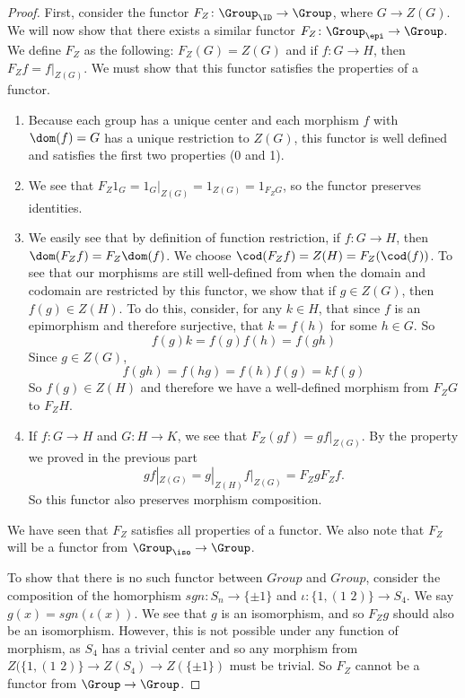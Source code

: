 \documentclass[main.tex]{subfiles}
\begin{document}
\begin{proof}


First, consider the functor $F_Z\colon \Group_{\ID}\rightarrow \Group$, where $G \rightarrow Z(G)$. We will now show that there exists a similar functor $F_Z\colon \Group_{\epi} \rightarrow \Group$. We define $F_Z$ as the following: $F_Z(G) = Z(G)$ and if $f\colon G \rightarrow H$, then $F_{Z} f = f|_{Z(G)}$. We must show that this functor satisfies the properties of a functor.
\begin{enumerate}
    \item Because each group has a unique center and each morphism $f$ with $\dom(f) = G$ has a unique restriction to $Z(G)$, this functor is well defined and satisfies the first two properties (0 and 1).
    \item We see that $F_{Z} 1_{G} = 1_{G}|_{Z(G)} = 1_{Z(G)} = 1_{F_{Z}G}$, so the functor preserves identities. 
    \item We easily see that by definition of function restriction, if $f\colon G \rightarrow H$, then $\dom(F_{Z}f) = F_{Z}\dom(f)$. We choose $\cod(F_{Z}f) = Z(H) = F_Z(\cod(f))$.  To see that our morphisms are still well-defined from when the domain and codomain are restricted by this functor, we show that if $g \in Z(G)$, then $f(g) \in Z(H)$. To do this, consider, for any $k \in H$, that since $f$ is an epimorphism and therefore surjective, that $k = f(h)$ for some $h \in G$. So \[f(g)k = f(g)f(h) = f(gh)\]Since $g \in Z(G)$, \[f(gh) = f(hg) = f(h)f(g) = kf(g)\] So $f(g) \in Z(H)$ and therefore we have a well-defined morphism from $F_ZG$ to $F_ZH$. 
    \item If $f\colon G \rightarrow H$ and $G\colon H \rightarrow K$, we see that $F_Z(gf) = gf|_{Z(G)}$. By the property we proved in the previous part \[gf|_{Z(G)} = g|_{Z(H)}f|_{Z(G)} = F_ZgF_Zf.\] So this functor also preserves morphism composition. 
\end{enumerate}

We have seen that $F_Z$ satisfies all properties of a functor. We also note that $F_Z$ will be a functor from $\Group_{\iso} \rightarrow \Group$. 

To show that there is no such functor between $Group$ and $Group$, consider the composition of the homorphism $sgn\colon S_n \rightarrow \{ \pm 1 \} $ and $\iota\colon \{1, (1 \,\, 2) \} \rightarrow S_4$. We say $ g(x) = sgn(\iota(x))$. We see that $g$ is an isomorphism, and so $F_Zg$ should also be an isomorphism. However, this is not possible under any function of morphism, as $S_4$ has a trivial center and so any morphism from $Z(\{1, (1\,\,2)\} \rightarrow Z(S_4) \rightarrow Z(\{\pm 1\})$ must be trivial. So $F_Z$ cannot be a functor from $\Group \rightarrow \Group$.  


\end{proof}
\end{document}
